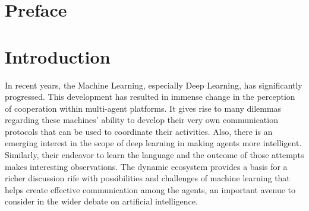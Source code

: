 \documentclass[11pt]{article}
\begin{document}
\section*{Preface}\label{Preface}
\vspace{2em}


\newpage
{}




\section{Introduction} \label{intro}
In recent years, the Machine Learning, especially Deep Learning, has significantly progressed. This development has resulted in immense change in the perception of cooperation within multi-agent platforms. It gives rise to many dilemmas regarding these machines' ability to develop their very own communication protocols that can be used to coordinate their activities. Also, there is an emerging interest in the scope of deep learning in making agents more intelligent. Similarly, their endeavor to learn the language and the outcome of those attempts makes interesting observations. The dynamic ecosystem provides a basis for a richer discussion rife with possibilities and challenges of machine learning that helps create effective communication among the agents, an important avenue to consider in the wider debate on artificial intelligence.
\end{document}
